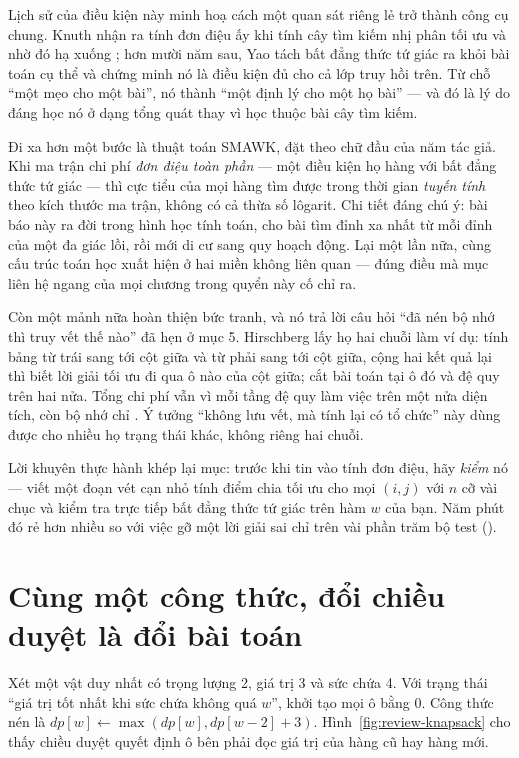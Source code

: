 \documentclass[../../algorithm.tex]{subfiles}
\begin{document}
Lịch sử của điều kiện này minh hoạ cách một quan sát riêng lẻ trở thành công cụ chung. Knuth\cite{knuth1971} nhận ra tính đơn điệu ấy khi tính cây tìm kiếm nhị phân tối ưu và nhờ đó hạ  xuống ; hơn mười năm sau, Yao\cite{yao1982} tách bất đẳng thức tứ giác ra khỏi bài toán cụ thể và chứng minh nó là điều kiện đủ cho cả lớp truy hồi trên. Từ chỗ ``một mẹo cho một bài'', nó thành ``một định lý cho một họ bài'' --- và đó là lý do đáng học nó ở dạng tổng quát thay vì học thuộc bài cây tìm kiếm.

Đi xa hơn một bước là thuật toán SMAWK\cite{aggarwal1987}, đặt theo chữ đầu của năm tác giả. Khi ma trận chi phí \emph{đơn điệu toàn phần} --- một điều kiện họ hàng với bất đẳng thức tứ giác --- thì cực tiểu của mọi hàng tìm được trong thời gian \emph{tuyến tính} theo kích thước ma trận, không có cả thừa số lôgarit. Chi tiết đáng chú ý: bài báo này ra đời trong hình học tính toán, cho bài tìm đỉnh xa nhất từ mỗi đỉnh của một đa giác lồi, rồi mới di cư sang quy hoạch động. Lại một lần nữa, cùng cấu trúc toán học xuất hiện ở hai miền không liên quan --- đúng điều mà mục liên hệ ngang của mọi chương trong quyển này cố chỉ ra.

Còn một mảnh nữa hoàn thiện bức tranh, và nó trả lời câu hỏi ``đã nén bộ nhớ thì truy vết thế nào'' đã hẹn ở mục 5. Hirschberg\cite{hirschberg1975} lấy họ hai chuỗi làm ví dụ: tính bảng từ trái sang tới cột giữa và từ phải sang tới cột giữa, cộng hai kết quả lại thì biết lời giải tối ưu đi qua ô nào của cột giữa; cắt bài toán tại ô đó và đệ quy trên hai nửa. Tổng chi phí vẫn  vì mỗi tầng đệ quy làm việc trên một nửa diện tích, còn bộ nhớ chỉ . Ý tưởng ``không lưu vết, mà tính lại có tổ chức'' này dùng được cho nhiều họ trạng thái khác, không riêng hai chuỗi.

Lời khuyên thực hành khép lại mục: trước khi tin vào tính đơn điệu, hãy \emph{kiểm} nó --- viết một đoạn vét cạn nhỏ tính điểm chia tối ưu cho mọi \((i,j)\) với \(n\) cỡ vài chục và kiểm tra trực tiếp bất đẳng thức tứ giác trên hàm \(w\) của bạn. Năm phút đó rẻ hơn nhiều so với việc gỡ một lời giải sai chỉ trên vài phần trăm bộ test ().

\section{Cùng một công thức, đổi chiều duyệt là đổi bài toán}

Xét một vật duy nhất có trọng lượng 2, giá trị 3 và sức chứa 4.
Với trạng thái ``giá trị tốt nhất khi sức chứa không quá \(w\)'', khởi tạo mọi ô bằng 0.
Công thức nén là \(dp[w]\leftarrow\max(dp[w],dp[w-2]+3)\).
Hình~\ref{fig:review-knapsack} cho thấy chiều duyệt quyết định ô bên phải đọc giá trị của hàng cũ hay hàng mới.
\end{document}

